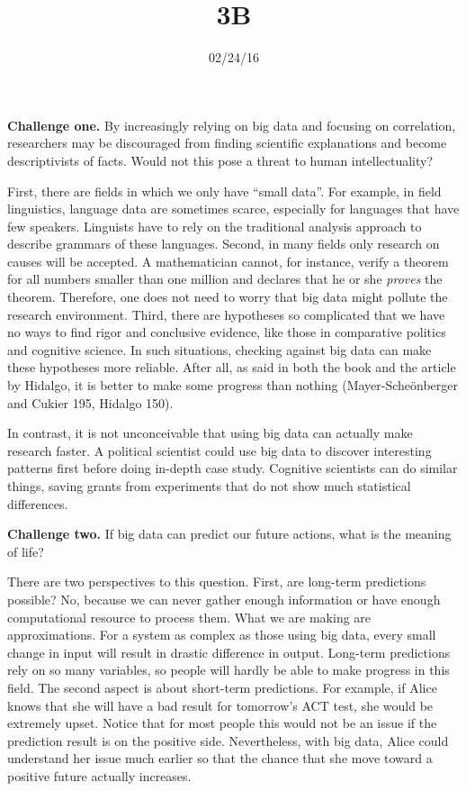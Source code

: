 \documentclass{writing}
\title{3B}
\date{02/24/16}
\begin{document}
\maketitle

\textbf{Challenge one.} By increasingly relying on big data and focusing
on correlation, researchers may be discouraged from finding scientific
explanations and become descriptivists of facts. Would not this pose a
threat to human intellectuality?

First, there are fields in which we only have ``small data''. For
example, in field linguistics, language data are sometimes scarce,
especially for languages that have few speakers. Linguists have to rely
on the traditional analysis approach to describe grammars of these
languages. Second, in many fields only research on causes will be
accepted. A mathematician cannot, for instance, verify a theorem for all
numbers smaller than one million and declares that he or she
\emph{proves} the theorem. Therefore, one does not need to worry that
big data might pollute the research environment. Third, there are
hypotheses so complicated that we have no ways to find rigor and
conclusive evidence, like those in comparative politics and cognitive
science. In such situations, checking against big data can make these
hypotheses more reliable. After all, as said in both the book and the
article by Hidalgo, it is better to make some progress than nothing
(Mayer-Scheönberger and Cukier 195, Hidalgo 150).

In contrast, it is not unconceivable that using big data can actually
make research faster. A political scientist could use big data to
discover interesting patterns first before doing in-depth case study.
Cognitive scientists can do similar things, saving grants from
experiments that do not show much statistical differences.

\textbf{Challenge two.} If big data can predict our future actions, what
is the meaning of life?

There are two perspectives to this question. First, are long-term
predictions possible? No, because we can never gather enough information
or have enough computational resource to process them. What we are
making are approximations. For a system as complex as those using big
data, every small change in input will result in drastic difference in
output. Long-term predictions rely on so many variables, so people will
hardly be able to make progress in this field. The second aspect is
about short-term predictions. For example, if Alice knows that she will
have a bad result for tomorrow's ACT test, she would be extremely upset.
Notice that for most people this would not be an issue if the prediction
result is on the positive side. Nevertheless, with big data, Alice could
understand her issue much earlier so that the chance that she move
toward a positive future actually increases.
\end{document}
